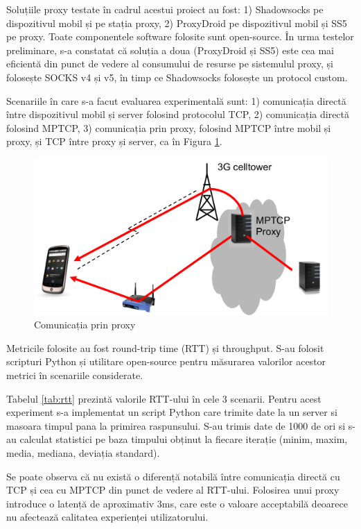 Soluțiile proxy testate în cadrul acestui proiect au fost: 1) Shadowsocks pe dispozitivul mobil și pe stația proxy, 2) ProxyDroid pe dispozitivul mobil și SS5 pe proxy. Toate componentele software folosite sunt open-source. În urma testelor preliminare, s-a constatat că soluția a doua (ProxyDroid și SS5) este cea  mai eficientă din punct de vedere al consumului de resurse pe sistemulul proxy, și folosește SOCKS v4 și v5, în timp ce Shadowsocks folosește un protocol custom.

Scenariile în care s-a facut evaluarea experimentală sunt: 1) comunicația directă între dispozitivul mobil și server folosind protocolul TCP, 2) comunicația directă folosind MPTCP, 3) comunicația prin proxy, folosind MPTCP între mobil și proxy, și TCP între proxy și server, ca în Figura \ref{fig:proxy}. 

\begin{figure}[h]
	\centering
	\includegraphics[scale=0.7]{figures/45g_proxy.png}
	\caption{Comunicația prin proxy}
    	\label{fig:proxy}
\end{figure}

Metricile folosite au fost round-trip time (RTT) și throughput. S-au folosit scripturi Python și utilitare open-source pentru măsurarea valorilor acestor metrici în scenariile considerate.

Tabelul \ref{tab:rtt} prezintă valorile RTT-ului în cele 3 scenarii. Pentru acest experiment s-a implementat un script Python care trimite date la un server si masoara timpul pana la primirea raspunsului. S-au trimis date de 1000 de ori si s-au calculat statistici pe baza timpului obținut la fiecare iterație (minim, maxim, media, mediana, deviația standard).

Se poate observa că nu există o diferență notabilă între comunicația directă cu TCP și cea cu MPTCP din punct de vedere al RTT-ului. Folosirea unui proxy introduce o latență de aproximativ 3ms, care este o valoare acceptabilă deoarece nu afectează calitatea experienței utilizatorului.

